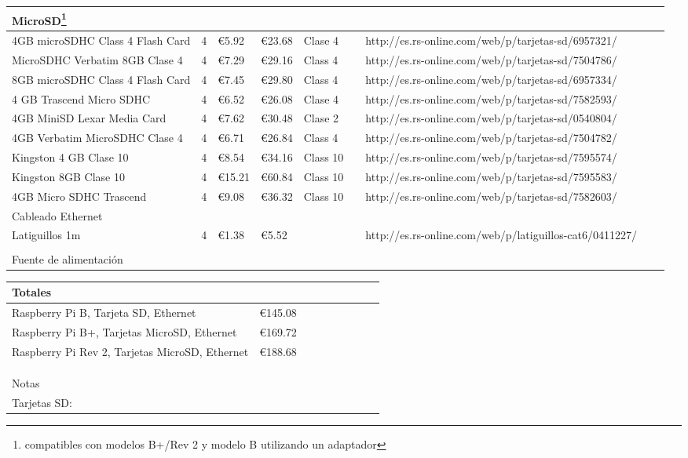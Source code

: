 \begin{landscape}
\begin{tabular}{|l|l|l|l|l|l|l|l|l|}
\hline
MicroSD\footnote{compatibles con modelos B+/Rev 2 y modelo B utilizando un adaptador}&&&&&&\\
\hline
4GB microSDHC Class 4 Flash Card&4&€5.92&€23.68&Clase 4&&http://es.rs-online.com/web/p/tarjetas-sd/6957321/\\
\hline
MicroSDHC Verbatim 8GB Clase 4&4&€7.29&€29.16&Class 4&&http://es.rs-online.com/web/p/tarjetas-sd/7504786/\\
\hline

8GB microSDHC Class 4 Flash Card&4&€7.45&€29.80&Class 4&&http://es.rs-online.com/web/p/tarjetas-sd/6957334/&&\\
\hline
4 GB Trascend Micro SDHC&4&€6.52&€26.08&Clase 4&&http://es.rs-online.com/web/p/tarjetas-sd/7582593/&&\\
\hline
4GB MiniSD Lexar Media Card&4&€7.62&€30.48&Clase 2&&http://es.rs-online.com/web/p/tarjetas-sd/0540804/&&\\
\hline
4GB Verbatim MicroSDHC Clase 4&4&€6.71&€26.84&Class 4&&http://es.rs-online.com/web/p/tarjetas-sd/7504782/&&\\
\hline
\rowcolor{LightCyan}
Kingston 4 GB Clase 10&4&€8.54&€34.16&Class 10&&http://es.rs-online.com/web/p/tarjetas-sd/7595574/&&\\
\hline
\rowcolor{LightCyan}
Kingston 8GB Clase 10&4&€15.21&€60.84&Class 10&&http://es.rs-online.com/web/p/tarjetas-sd/7595583/&&\\
\hline
4GB Micro SDHC Trascend&4&€9.08&€36.32&Class 10&&http://es.rs-online.com/web/p/tarjetas-sd/7582603/&&\\
\hline
Cableado Ethernet&&&&&&&&\\
\hline
Latiguillos 1m&4&€1.38&€5.52&&&http://es.rs-online.com/web/p/latiguillos-cat6/0411227/&&\\
\hline
&&&&&&&&\\
\hline
Fuente de alimentación&&&&&&&&\\
\hline
\end{tabular}
\end{landscape}
\begin{landscape}
\begin{tabular}{|l|l|l|l|l|l|l|l|l|}
Totales&&&&&&&&\\
\hline
Raspberry Pi B, Tarjeta SD, Ethernet&€145.08&&&&&&&\\
\hline
Raspberry Pi B+, Tarjetas MicroSD, Ethernet&€169.72&&&&&&&\\
\hline
Raspberry Pi Rev 2, Tarjetas MicroSD, Ethernet&€188.68&&&&&&&\\
\hline
&&&&&&&&\\
\hline
&&&&&&&&\\
\hline
&&&&&&&&\\
\hline
Notas&&&&&&&&\\
\hline
Tarjetas SD:&&&&&&&&\\
\hline
\end{tabular}
\end{landscape}

